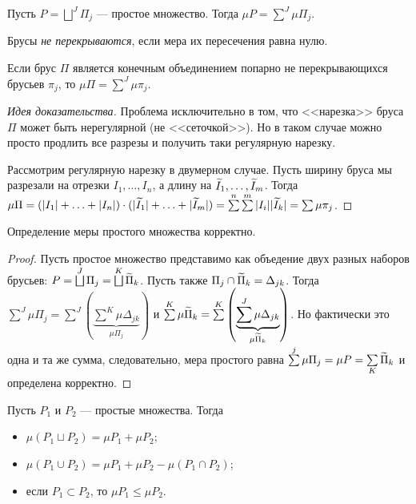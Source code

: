 \begin{Def}
Пусть $P = \bigsqcup\limits^J\Pi_j$ --- простое множество. Тогда $\mu P = \sum\limits^J \mu\Pi_j$.
\end{Def}

\begin{Def}
Брусы \textit{не перекрываются}, если мера их пересечения равна нулю.
\end{Def}

\begin{Statement}
Если брус $\Pi$ является конечным объединением попарно не перекрывающихся брусьев $\pi_j$, то $\mu \Pi = \sum\limits^J \mu \pi_j$.
\end{Statement}
\begin{proof}[Идея доказательства]
Проблема исключительно в том, что <<нарезка>> бруса $\Pi$ может быть нерегулярной (не <<сеточкой>>). Но в таком случае можно просто продлить все разрезы и получить таки регулярную нарезку.

Рассмотрим регулярную нарезку в двумерном случае. Пусть ширину бруса мы разрезали на отрезки $I_1, \ldots, I_n$, а длину на $\widetilde{I}_1, \ldots, \widetilde{I}_m$. Тогда $\mu\Pi = (|I_1| + \ldots + |I_n|) \cdot (|\I_1| + \ldots + |\I_m|) \hm= \sum\limits^n\sum\limits^m|I_i||\I_k| = \sum\mu\pi_j$.
\end{proof}

\begin{Statement}
Определение меры простого множества корректно.
\end{Statement}
\begin{proof}
Пусть простое множество представимо как объедение двух разных наборов брусьев: $P = \bigsqcup\limits^J\Pi_j = \bigsqcup\limits^K\widetilde{\Pi}_k$. Пусть также $\Pi_j \cap \widetilde{\Pi}_k = \Delta_{jk}$. Тогда $\sum\limits^J \mu\Pi_j = \sum\limits^J\left( \underbrace{\sum\limits^K \mu \Delta_{jk}}_{\mu\Pi_j}  \right)$ и $\sum\limits^K\mu \widetilde{\Pi}_k = \sum\limits^K\left( \underbrace{\sum\limits^J\mu \Delta_{jk}}_{\mu\widetilde{\Pi}_k} \right)$. Но фактически это одна и та же сумма, следовательно, мера простого равна $\sum\limits^j\mu\Pi_j = \mu P  = \sum\limits_K\widetilde{\Pi}_k$ и определена корректно.
\end{proof}
\begin{Statement}
Пусть $P_1$ и $P_2$ --- простые множества. Тогда
\begin{itemize}
\item $\mu(P_1 \sqcup P_2) = \mu P_1 + \mu P_2$;
\item $\mu(P_1 \cup P_2) = \mu P_1 + \mu P_2 - \mu(P_1 \cap P_2)$;
\item если $P_1 \subset P_2$, то $\mu P_1 \leq \mu P_2$.
\end{itemize}
\end{Statement}

